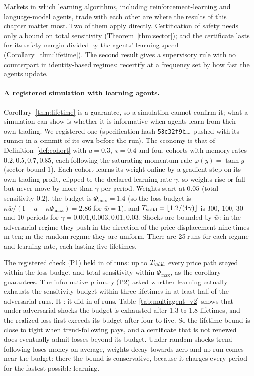 Markets in which learning algorithms, including reinforcement-learning and language-model agents, trade with each other are where the results of this chapter matter most. Two of them apply directly. Certification of safety needs only a bound on total sensitivity (Theorem~\ref{thm:sector}); and the certificate lasts for its safety margin divided by the agents' learning speed (Corollary~\ref{thm:lifetime}). The second result gives a supervisory rule with no counterpart in identity-based regimes: recertify at a frequency set by how fast the agents update.

\paragraph{A registered simulation with learning agents.}


Corollary~\ref{thm:lifetime} is a guarantee, so a simulation cannot confirm it; what a simulation can show is whether it is informative when agents learn from their own trading. We registered one (specification hash \texttt{58c32f9b\ldots}, pushed with its runner in a commit of its own before the run). The economy is that of Definition~\ref{def:cohort} with $a=0.3$, $\kappa=0.4$ and four cohorts with memory rates $0.2,0.5,0.7,0.85$, each following the saturating momentum rule $\varphi(y)=\tanh y$ (sector bound $1$). Each cohort learns its weight online by a gradient step on its own trading profit, clipped to the declared learning rate $\gamma$, so weights rise or fall but never move by more than $\gamma$ per period. Weights start at $0.05$ (total sensitivity $0.2$), the budget is $\Phi_{\max}=1.4$ (so the loss budget is $\kappa\bar w/(1-a-\kappa\Phi_{\max})=2.86$ for $\bar w=1$), and $T_{\rm valid}=\lfloor1.2/(4\gamma)\rfloor$ is $300$, $100$, $30$ and $10$ periods for $\gamma=0.001,0.003,0.01,0.03$. Shocks are bounded by $\bar w$: in the adversarial regime they push in the direction of the price displacement nine times in ten; in the random regime they are uniform. There are 25 runs for each regime and learning rate, each lasting five lifetimes.

The registered check (P1) held in \MAvTwoPonePasses{} of \MAvTwoRuns{} runs: up to $T_{\rm valid}$ every price path stayed within the loss budget and total sensitivity within $\Phi_{\max}$, as the corollary guarantees. The informative primary (P2) asked whether learning actually exhausts the sensitivity budget within three lifetimes in at least half of the adversarial runs. It \MAvTwoPtwoVerdict{}: it did in \MAvTwoPtwoHits{} of \MAvTwoAdvRuns{} runs. Table~\ref{tab:multiagent_v2} shows that under adversarial shocks the budget is exhausted after 1.3 to 1.8 lifetimes, and the realized loss first exceeds its budget after four to five. So the lifetime bound is close to tight when trend-following pays, and a certificate that is not renewed does eventually admit losses beyond its budget. Under random shocks trend-following loses money on average, weights decay towards zero and no run comes near the budget: there the bound is conservative, because it charges every period for the fastest possible learning.

